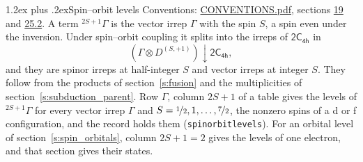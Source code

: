 \documentclass[10pt,a4paper]{article}
\makeatletter
\renewcommand\section{\@startsection{section}{1}{\z@}{-3ex plus -1ex minus -.2ex}%
  {1.2ex plus .2ex}{\normalfont\large\sffamily\bfseries\color{parttitle}}}
\numberwithin{equation}{section}
\newcommand{\grp}[1]{\mathsf{#1}}
\newcommand{\restr}[2]{#1\!\downarrow#2}
\newcommand{\irrJp}[2]{D^{(#1,#2)}}
\newcommand{\irrprod}{\otimes}
\newcommand{\term}[2]{{}^{#1}#2}
\makeatother
\begin{document}
\section{Spin--orbit levels}\label{s:spin_orbit}
Conventions: \href{../../CONVENTIONS.pdf}{CONVENTIONS.pdf}, sections \href{../../../rotation/CONVENTIONS.pdf\#conv.19}{19} and \href{../../CONVENTIONS.pdf\#conv.25.2}{25.2}.
\leavevmode\label{n:local.spin}\label{n:symbol.term}A term $\term{2S+1}{\Gamma}$ is the vector irrep $\Gamma$ with the spin $S$, a spin even under the inversion. Under spin--orbit coupling it splits into the irreps of $\grp{2C_{4h}}$ in
\begin{equation}\label{e:spinorbit}\restr{(\Gamma \irrprod \irrJp{S}{+1})}{\grp{2C_{4h}}},\end{equation}
and they are spinor irreps at half-integer $S$ and vector irreps at integer $S$. They follow from the products of section~\ref{s:fusion} and the multiplicities of section~\ref{s:subduction_parent}. Row $\Gamma$, column $2S + 1$ of a table gives the levels of $\term{2S+1}{\Gamma}$ for every vector irrep $\Gamma$ and $S = \nicefrac{1}{2}, 1, \dots, \nicefrac{7}{2}$, the nonzero spins of a d or f configuration, and the record holds them (\texttt{spinorbitlevels}). For an orbital level of section~\ref{s:spin_orbitals}, column $2S + 1 = 2$ gives the levels of one electron, and that section gives their states.
\end{document}
